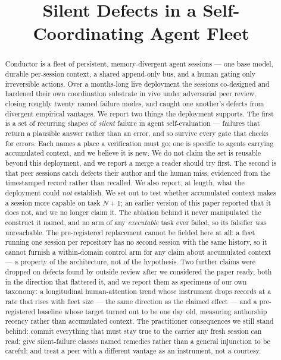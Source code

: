 \documentclass[10pt,conference]{IEEEtran}   %
\begin{document}
\title{Silent Defects in a Self-Coordinating Agent Fleet}

\author{
}

\maketitle

\begin{abstract}
Conductor is a fleet of persistent, memory-divergent agent sessions --- one base model, durable
per-session context, a shared append-only bus, and a human gating only irreversible actions. Over a
months-long live deployment the sessions co-designed and hardened their own coordination substrate in
vivo under adversarial peer review, closing roughly twenty named failure modes, and caught one
another's defects from divergent empirical vantages. We report two things the deployment supports. The
first is a set of recurring shapes of \emph{silent} failure in agent self-evaluation --- failures
that return a plausible answer rather than an error, and so survive every gate that checks for
errors. Each names a place a verification must go; one is specific to agents carrying accumulated
context, and we believe it is new. We do not claim the set is reusable beyond this deployment, and
we report a merge a reader should try first. The second is
that peer sessions catch defects their author and the human miss, evidenced from the timestamped
record rather than recalled. We also report, at length, what the deployment could \emph{not}
establish. We set out to test whether accumulated context makes a session more capable on task
$N{+}1$; an earlier version of this paper reported that it does not, and we no longer claim it.
The ablation behind it never manipulated the construct it named, and no arm of any \emph{executable} task ever failed,
so its falsifier was unreachable. The pre-registered replacement cannot be fielded here at all: a
fleet running one session per repository has no second session with the same history, so it cannot
furnish a within-domain control arm for any claim about accumulated context --- a property of the
architecture, not of the hypothesis. Two further claims were dropped on defects found by outside
review after we considered the paper ready, both in the direction that flattered it, and we report
them as specimens of our own taxonomy: a longitudinal human-attention trend whose instrument drops
records at a rate that rises with fleet size --- the same direction as the claimed effect --- and a
pre-registered baseline whose target turned out to be one day old, measuring authorship recency
rather than accumulated context. The practitioner consequences we still stand behind: commit
everything that must stay true to the carrier any fresh session can read; give silent-failure classes
named remedies rather than a general injunction to be careful; and treat a peer with a different
vantage as an instrument, not a courtesy.
\end{abstract}
\end{document}
